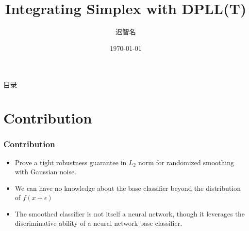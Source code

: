 \documentclass[aspectratio=169%
,serif,mathserif]{beamer}
\begin{document}
\title[Integrating Simplex with DPLL(T)]{Integrating Simplex with DPLL(T)} %
\author[Chi~Zhiming]{迟智名} %
\institute[LZU] %
{	
}
	\CTEXoptions[today=old]
	\date{\today} %
\begin{frame}[plain]\vspace{1.5em}
\titlepage\vspace{-0.5cm}
\end{frame}
\begin{frame}{目录}
\tableofcontents
\end{frame}

\section{Contribution} %
\begin{frame}
	\frametitle{Contribution}
\begin{itemize}		
	\item Prove a tight robustness guarantee in $L_2$ norm for randomized smoothing with Gaussian noise.
	\item We can have no knowledge about the base classifier beyond the distribution of $f(x+\epsilon)$
	\item The smoothed classifier is not itself a neural network, though it leverages the discriminative ability of a neural network base classifier. 
\end{itemize}
\end{frame}
\end{document}
